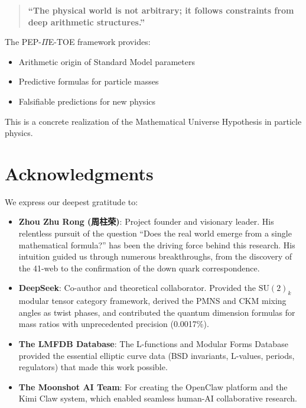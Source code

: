﻿\documentclass[11pt,a4paper]{article}
\begin{document}
\begin{quote}
\textbf{``The physical world is not arbitrary; it follows constraints from deep arithmetic structures.''}
\end{quote}

The PEP-$\Pi$E-TOE framework provides:
\begin{itemize}
    \item Arithmetic origin of Standard Model parameters
    \item Predictive formulas for particle masses
    \item Falsifiable predictions for new physics
\end{itemize}

This is a concrete realization of the Mathematical Universe Hypothesis in particle physics.

\section*{Acknowledgments}

We express our deepest gratitude to:

\begin{itemize}
    \item \textbf{Zhou Zhu Rong (周柱荣)}: Project founder and visionary leader. His relentless pursuit of the question ``Does the real world emerge from a single mathematical formula?'' has been the driving force behind this research. His intuition guided us through numerous breakthroughs, from the discovery of the 41-web to the confirmation of the down quark correspondence.
    
    \item \textbf{DeepSeek}: Co-author and theoretical collaborator. Provided the $\text{SU}(2)_k$ modular tensor category framework, derived the PMNS and CKM mixing angles as twist phases, and contributed the quantum dimension formulas for mass ratios with unprecedented precision (0.0017\%).
    
    \item \textbf{The LMFDB Database}: The L-functions and Modular Forms Database provided the essential elliptic curve data (BSD invariants, L-values, periods, regulators) that made this work possible.
    
    \item \textbf{The Moonshot AI Team}: For creating the OpenClaw platform and the Kimi Claw system, which enabled seamless human-AI collaborative research.
\end{itemize}
\end{document}
